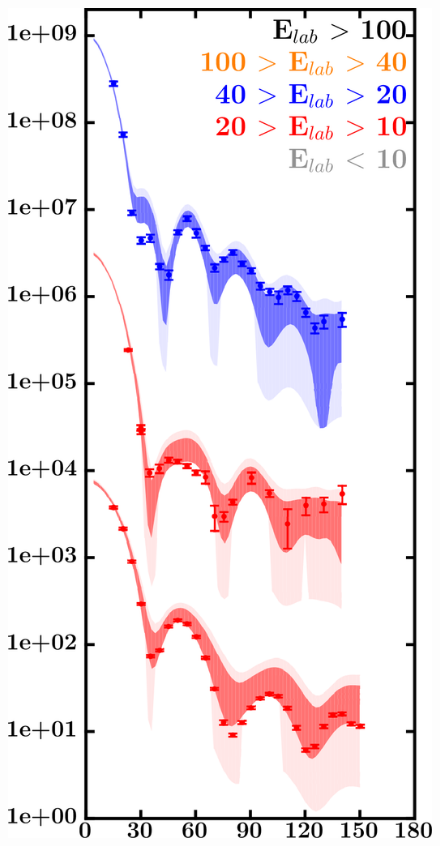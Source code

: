 \documentclass[twocolumn,secnumarabic,amssymb, nobibnotes, aps, prl,
superscriptaddress, nobalancelastpage]{revtex4}
\begin{document}
\begin{figure}[!htb]
\begin{minipage}{0.4\linewidth}
        \includegraphics[width=\linewidth]{figures/sn124_neutronElastic.png}
        \label{DOM_sn124_neutron_elastic}
    \end{minipage}
    \centering
    \begin{minipage}{0.4\linewidth}
        \centering

\end{minipage}
\end{figure}
\end{document}
